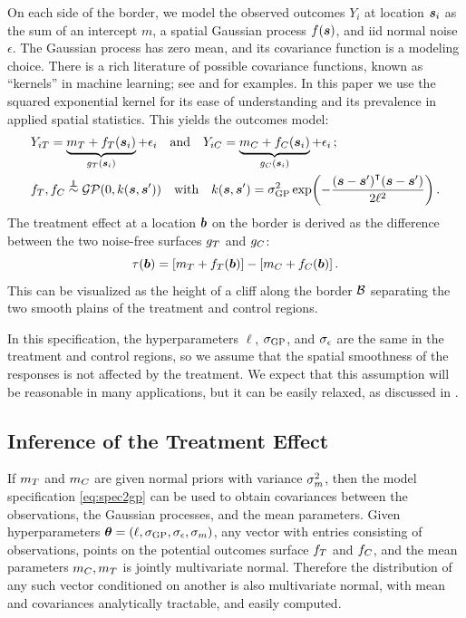 On each side of the border, we model the observed outcomes \(Y_i\) at location \(\bm{s}_i\) as the sum of an intercept \(m\), a spatial Gaussian process \(f(\bm{s})\), and iid normal noise \(\epsilon\).
The Gaussian process has zero mean, and its covariance function is a modeling choice.
There is a rich literature of possible covariance functions, known as ``kernels'' in machine learning; see
\cite{banerjee2014hierarchical} and \cite{rasmussen2006gaussian} for examples.
In this paper we use the squared exponential kernel for its ease of understanding and its prevalence in applied spatial statistics.
This yields the outcomes model:
\begin{equation}
    \begin{split}
        & Y_{i\treat} = \underbrace{m_\treat{} + f_\treat{}(\svec_i)}_{g_\treat{}(\svec_i)} + \epsilon_i \quad\text{and}\quad
        Y_{i\ctrol} = \underbrace{m_\ctrol{} + f_\ctrol{}(\svec_i)}_{g_\ctrol{}(\svec_i)} + \epsilon_i \,; \\
        & f_\treat{}, f_\ctrol{} \overset{\indep}{\sim} \GP\del{0, k(\svec, \svec')} \quad\text{with}\quad
        k(\svec,\svec') = \sigmaf^2 \exp\del{ - \frac{\del{\svec-\svec'}\trans\del{\svec-\svec'}}{2 \ell^2}} \,.
    \end{split}
    \label{eq:spec2gp}
\end{equation}
The treatment effect at a location \(\bm{b}\) on the border is derived as the difference between the two noise-free surfaces \(g_T{}\) and \(g_C{}\):
\begin{equation}
    \tau(\sentinel) = \sbr{m_\treat{} + f_\treat{}(\sentinel)} - \sbr{m_\ctrol{} + f_\ctrol{}(\sentinel)}\,.
\end{equation}
This can be visualized as the height of a cliff along the border \(\mathcal{B}\) separating the two smooth plains of the treatment and control regions.

In this specification, the hyperparameters \(\ell\), \(\sigma_{\mathrm{GP}}\), and \(\sigma_{\epsilon}\) are the same in the treatment and control regions, so we assume that the spatial smoothness of the responses is not affected by the treatment.
We expect that this assumption will be reasonable in many applications, but it can be easily relaxed, as discussed in \cite{Branson:2017qy}.



\subsection{Inference of the Treatment Effect}
\label{sec:inference}
If \(m_T\) and \(m_C\) are given normal priors with variance \(\sigma_{m}^2\), then the model specification \autoref{eq:spec2gp} can be used to obtain covariances between the observations, the Gaussian processes, and the mean parameters.
Given hyperparameters \(\bm{\theta} = \left\lparen\ell,\sigma_{\mathrm{GP}}, \sigma_{\epsilon}, \sigma_{m}\right\rparen\), any vector with entries consisting of observations, points on the potential outcomes surface \(f_{T}\) and \(f_{C}\), and the mean parameters \(m_{C}, m_{T}\) is jointly multivariate normal. Therefore the distribution of any such vector conditioned on another is also multivariate normal, with mean and covariances analytically tractable, and easily computed.

